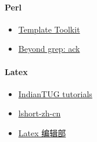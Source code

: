 \paragraph{Perl}
\begin{itemize}
	\item \href{http://www.template-toolkit.org/}{Template Toolkit}
	\item \href{http://beyondgrep.com/}{Beyond grep: ack}
\end{itemize}
\paragraph{Latex}
\begin{itemize}
	\item \href{http://www.tug.org.in/tutorials.html}{IndianTUG tutorials}
	\item \href{http://www.ctan.org/tex-archive/info/lshort/chinese}{lshort-zh-cn}
	\item \href{http://www.latexstudio.net/hulatex/}{Latex 编辑部}
\end{itemize}
